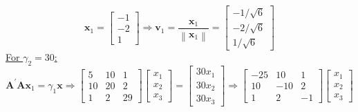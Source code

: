 \begin{enumerate}[label=(\alph*)]
            \[
                \mathbf{x}_1
                =
                \begin{bmatrix}
                    -1 \\
                    -2 \\
                    1
                \end{bmatrix}
                \Rightarrow
                \mathbf{v}_1
                =
                \frac{\mathbf{x}_1}{\left\|\mathbf{x}_1\right\|}
                =
                \begin{bmatrix}
                    -1/\sqrt{6} \\
                    -2/\sqrt{6} \\
                    1/\sqrt{6}
                \end{bmatrix}
            \]
            \underline{For $\gamma_2 = 30$:}
            \[
                \mathbf{A}^\prime\mathbf{A}\mathbf{x}_1 = \gamma_1\mathbf{x}
                \Rightarrow
                \begin{bmatrix}
                    5 & 10 & 1 \\
                    10 & 20 & 2 \\
                    1 & 2 & 29
                \end{bmatrix}
                \begin{bmatrix}
                    x_1 \\
                    x_2 \\
                    x_3
                \end{bmatrix}
                =
                \begin{bmatrix}
                    30 x_1\\
                    30 x_2 \\
                    30 x_3
                \end{bmatrix}
                \Rightarrow
                \begin{bmatrix}
                    -25 & 10 & 1 \\
                    10 & -10 & 2 \\
                    1 & 2 & -1
                \end{bmatrix}
                \begin{bmatrix}
                    x_1 \\
                    x_2 \\
                    x_3
                \end{bmatrix}
\]
\end{enumerate}
